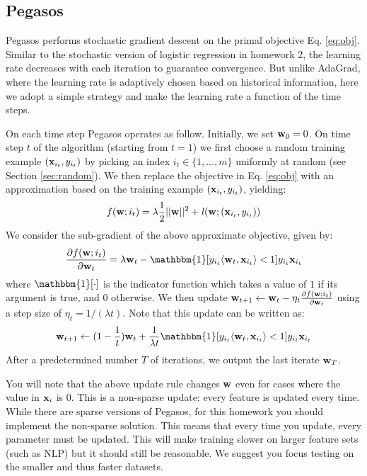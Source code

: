 \documentclass[11pt]{article}
\newcommand{\vw}{{\bf w}}
\newcommand{\vx}{{\bf x}}
\newcommand{\vxi}{{\bf x}_i}
\begin{document}
\subsection{Pegasos}
\label{sec:pegasos}
Pegasos performs stochastic gradient descent on the primal objective Eq. \ref{eq:obj}. Similar to the stochastic version of logistic regression in homework 2, the learning rate decreases with each iteration to guarantee convergence. But unlike AdaGrad, where the learning rate is adaptively chosen based on historical information, here we adopt a simple strategy and make the learning rate a function of the time steps.

On each time step Pegasos operates as follow. Initially, we set $\vw_0=0$. On time step $t$ of the algorithm (starting from $t=1$) we first choose a random training example $(\vx_{i_t},y_{i_t})$ by picking an index $i_t \in \{1,\ldots,m\}$ uniformly at random (see Section \ref{sec:random}). We then replace the objective in Eq. \ref{eq:obj} with an approximation based on the training example $(\vx_{i_t},y_{i_t})$, yielding:
\begin{align}
\label{eq:sgd}
f(\vw;i_t)=\lambda\frac{1}{2}||\vw||^2+ \mathit{l}(\vw;(\vx_{i_t},y_{i_t}))
\end{align}
We consider the sub-gradient of the above approximate objective, given by:
\begin{align}
\frac{\partial f(\vw;i_t)}{\partial \vw_t}=\lambda \vw_t-\mathbbm{1}[y_{i_t}\langle\vw_t,\vx_{i_t}\rangle < 1]y_{i_t}\vx_{i_t}
\end{align}
where $\mathbbm{1}[\cdot]$ is the indicator function which takes a value of $1$ if its argument is true, and $0$ otherwise. We then update $\vw_{t+1} \leftarrow \vw_t-\eta_t \frac{\partial f(\vw;i_t)}{\partial \vw_t}$ using a step size of $\eta_t=1/(\lambda t)$. Note that this update can be written as:
\begin{align}
\vw_{t+1} \leftarrow (1-\frac{1}{t})\vw_t+\frac{1}{\lambda t} \mathbbm{1}[y_{i_t}\langle\vw_t,\vx_{i_t}\rangle < 1]y_{i_t}\vx_{i_t}
\end{align}
After a predetermined number $T$ of iterations, we output the last iterate $\vw_T$.

You will note that the above update rule changes $\vw$ even for cases where the value in $\vxi$ is 0. This is a non-sparse update: every feature is updated every time. While there are sparse versions of Pegasos, for this homework you should implement the non-sparse solution. This means that every time you update, every parameter must be updated. This will make training slower on larger feature sets (such as NLP) but it should still be reasonable. We suggest you focus testing on the smaller and thus faster datasets.
\end{document}
